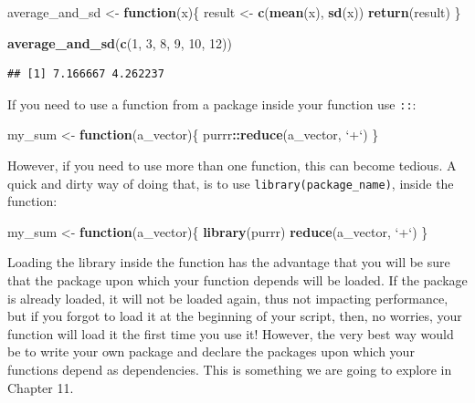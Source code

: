 \documentclass[]{gitbook}
\newenvironment{Shaded}{\begin{snugshade}}{\end{snugshade}}
\newcommand{\ControlFlowTok}[1]{\textcolor[rgb]{0.13,0.29,0.53}{\textbf{#1}}}
\newcommand{\DataTypeTok}[1]{\textcolor[rgb]{0.13,0.29,0.53}{#1}}
\newcommand{\DecValTok}[1]{\textcolor[rgb]{0.00,0.00,0.81}{#1}}
\newcommand{\KeywordTok}[1]{\textcolor[rgb]{0.13,0.29,0.53}{\textbf{#1}}}
\newcommand{\NormalTok}[1]{#1}
\newcommand{\OperatorTok}[1]{\textcolor[rgb]{0.81,0.36,0.00}{\textbf{#1}}}
\newcommand{\StringTok}[1]{\textcolor[rgb]{0.31,0.60,0.02}{#1}}
\theoremstyle{definition}
\theoremstyle{definition}
\theoremstyle{definition}
\theoremstyle{remark}
\begin{document}
\begin{Shaded}
\begin{Highlighting}[]
\NormalTok{average_and_sd <-}\StringTok{ }\ControlFlowTok{function}\NormalTok{(x)\{}
\NormalTok{  result <-}\StringTok{ }\KeywordTok{c}\NormalTok{(}\KeywordTok{mean}\NormalTok{(x), }\KeywordTok{sd}\NormalTok{(x))}
\KeywordTok{return}\NormalTok{(result)}
\NormalTok{\}}

\KeywordTok{average_and_sd}\NormalTok{(}\KeywordTok{c}\NormalTok{(}\DecValTok{1}\NormalTok{, }\DecValTok{3}\NormalTok{, }\DecValTok{8}\NormalTok{, }\DecValTok{9}\NormalTok{, }\DecValTok{10}\NormalTok{, }\DecValTok{12}\NormalTok{))}
\end{Highlighting}
\end{Shaded}

\begin{verbatim}
## [1] 7.166667 4.262237
\end{verbatim}

If you need to use a function from a package inside your function use
\texttt{::}:

\begin{Shaded}
\begin{Highlighting}[]
\NormalTok{my_sum <-}\StringTok{ }\ControlFlowTok{function}\NormalTok{(a_vector)\{}
\NormalTok{  purrr}\OperatorTok{::}\KeywordTok{reduce}\NormalTok{(a_vector, }\StringTok{`}\DataTypeTok{+}\StringTok{`}\NormalTok{)}
\NormalTok{\}}
\end{Highlighting}
\end{Shaded}

However, if you need to use more than one function, this can become
tedious. A quick and dirty way of doing that, is to use
\texttt{library(package\_name)}, inside the function:

\begin{Shaded}
\begin{Highlighting}[]
\NormalTok{my_sum <-}\StringTok{ }\ControlFlowTok{function}\NormalTok{(a_vector)\{}
  \KeywordTok{library}\NormalTok{(purrr)}
  \KeywordTok{reduce}\NormalTok{(a_vector, }\StringTok{`}\DataTypeTok{+}\StringTok{`}\NormalTok{)}
\NormalTok{\}}
\end{Highlighting}
\end{Shaded}

Loading the library inside the function has the advantage that you will
be sure that the package upon which your function depends will be
loaded. If the package is already loaded, it will not be loaded again,
thus not impacting performance, but if you forgot to load it at the
beginning of your script, then, no worries, your function will load it
the first time you use it! However, the very best way would be to write
your own package and declare the packages upon which your functions
depend as dependencies. This is something we are going to explore in
Chapter 11.
\end{document}
